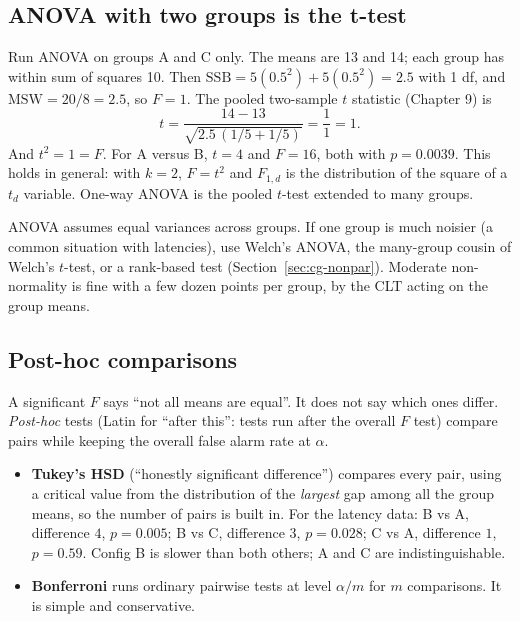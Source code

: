 \subsection{ANOVA with two groups is the t-test}

Run ANOVA on groups A and C only. The means are 13 and 14; each group has
within sum of squares 10. Then $\text{SSB} = 5(0.5^2) + 5(0.5^2) = 2.5$ with
1 df, and $\text{MSW} = 20/8 = 2.5$, so $F = 1$. The pooled two-sample $t$
statistic (Chapter 9) is
\[
  t = \frac{14 - 13}{\sqrt{2.5\,(1/5 + 1/5)}} = \frac{1}{1} = 1.
\]
And $t^2 = 1 = F$. For A versus B, $t = 4$ and $F = 16$, both with
$p = 0.0039$. This holds in general: with $k=2$, $F = t^2$ and $F_{1,d}$ is the
distribution of the square of a $t_d$ variable. One-way ANOVA is the pooled
$t$-test extended to many groups.

\begin{trapbox}
ANOVA assumes equal variances across groups. If one group is much noisier
(a common situation with latencies), use Welch's ANOVA, the many-group cousin
of Welch's $t$-test, or a rank-based test (Section~\ref{sec:cg-nonpar}).
Moderate non-normality is fine with a few dozen points per group, by the CLT
acting on the group means.
\end{trapbox}

\subsection{Post-hoc comparisons}

A significant $F$ says ``not all means are equal''. It does not say which ones
differ. \emph{Post-hoc} tests (Latin for ``after this'': tests run after the
overall $F$ test) compare pairs while keeping the overall false alarm rate
at $\alpha$.

\begin{itemize}
  \item \textbf{Tukey's HSD} (``honestly significant difference'') compares
  every pair, using a critical value from the distribution of the
  \emph{largest} gap among all the group means, so the number of pairs is
  built in. For the latency data: B vs A,
  difference $4$, $p = 0.005$; B vs C, difference $3$, $p = 0.028$; C vs A,
  difference $1$, $p = 0.59$. Config B is slower than both others; A and C are
  indistinguishable.
  \item \textbf{Bonferroni} runs ordinary pairwise tests at level
  $\alpha/m$ for $m$ comparisons. It is simple and conservative.
\end{itemize}

